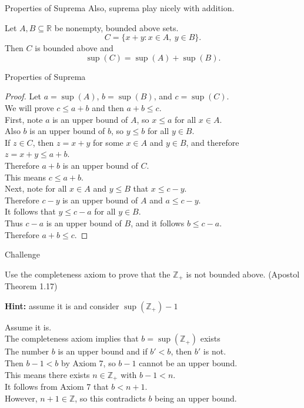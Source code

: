 \documentclass{beamer}
\begin{document}
\begin{frame}{Properties of Suprema}
Also, suprema play nicely with addition.
\begin{thm}
Let $A,B\subseteq\mathbb{R}$ be nonempty, bounded above sets.
$$C = \{x+y: x\in A,\ y\in B\}.$$
Then $C$ is bounded above and
$$\sup(C) = \sup(A) + \sup(B).$$
\end{thm}
\end{frame}
\begin{frame}{Properties of Suprema}
\begin{proof}
Let $a = \sup(A)$, $b = \sup(B)$, and $c=\sup(C)$. \\
\pause
We will prove $c \leq a+b$ and then $a+b\leq c$. \\
\pause
First, note $a$ is an upper bound of $A$, so $x\leq a$ for all $x\in A$. \\
\pause
Also $b$ is an upper bound of $b$, so $y\leq b$ for all $y\in B$. \\
\pause
If $z\in C$, then $z=x+y$ for some $x\in A$ and $y\in B$, and therefore $z = x+y \leq a+b$. \\
\pause
Therefore $a+b$ is an upper bound of $C$. \\
\pause
This means $c\leq a+b$. \\
\pause
Next, note for all $x\in A$ and $y\leq B$ that $x\leq c-y$. \\
\pause
Therefore $c-y$  is an upper bound of $A$ and $a\leq c-y$. \\
\pause
It follows that $y\leq c-a$ for all $y\in B$. \\
\pause
Thus $c-a$ is an upper bound of $B$, and it follows $b\leq c-a$. \\
\pause
Therefore $a+b\leq c$.
\end{proof}
\end{frame}


\begin{frame}{Challenge}
\begin{prob}
Use the completeness axiom to prove that the $\mathbb Z_+$ is not bounded above.
(Apostol Theorem 1.17)
\end{prob}
\pause
\textbf{Hint:} assume it is and consider $\sup(\mathbb Z_+)-1$
\pause
\begin{soln}
Assume it is.\\\pause
The completeness axiom implies that $b=\sup(\mathbb Z_+)$ exists\\\pause
The number $b$ is an upper bound and if $b' < b$, then $b'$ is not.\\\pause
Then $b-1 < b$ by Axiom 7, so $b-1$ cannot be an upper bound.\\\pause
This means there exists $n\in\mathbb{Z}_+$ with $b-1 < n$.\\\pause
It follows from Axiom 7 that $b < n+1$.\\\pause
However, $n+1\in\mathbb{Z}$, so this contradicts $b$ being an upper bound.
\end{soln}
\end{frame}
\end{document}

